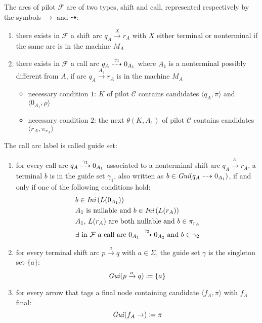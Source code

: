 \documentclass[english]{article}
\begin{document}
\bigskip
The arcs of pilot \(\mathcal{F}\) are of two types, shift and call, represented respectively by the symbols \(\rightarrow\) and \(\dashrightarrow\):

\begin{enumerate}
  \item there exists in \(\mathcal{F}\) a shift arc \(q_A \xrightarrow{X} r_A\) with \(X\) either terminal or nonterminal if the same arc is in the machine \(M_A\)
  \item there exists in \(\mathcal{F}\) a call arc \(q_A \stackrel{\gamma_1}{\dashrightarrow} 0_{A_1}\) where \(A_1\) is a nonterminal possibly different from \(A\), if arc \(q_A \xrightarrow{A_1} r_A\) is in the machine \(M_A\)
        \begin{itemize}[label=\(\rightarrow\)]
          \item necessary condition \(1\): \mstate \(K\) of pilot \(\mathcal{C}\) contains candidates \(\langle q_A, \pi \rangle\) and \(\langle 0_{A_1}, \rho\rangle\)
          \item necessary condition \(2\): the next \mstate \(\theta(K, A_1)\) of pilot \(\mathcal{C}\) contains candidates \(\langle r_A, \pi_{r_A} \rangle\)
        \end{itemize}
\end{enumerate}

\bigskip
The call arc label is called guide set:

\begin{enumerate}
  \item for every call arc \(q_A \stackrel{\gamma_1}{\dashrightarrow} 0_{A_1}\) associated to a nonterminal shift arc \(q_A \xrightarrow{A_1} r_A\), a terminal \(b\) is in the guide set \(\gamma_1\), also written as \(b \in \textit{Gui}\hspace{0.1ex}(q_A \dashrightarrow 0_{A_1})\), if and only if one of the following conditions hold:
        \begin{align}
           & b \in \Ini\left( L(0_{A_1}) \right) \label{eq:call-arc-condition-1}                                                                                              \\
           & A_1 \ \text{is nullable and} \ b \in \Ini\left( L(r_A) \right) \label{eq:call-arc-condition-2}                                                                   \\
           & A_1, \, L(r_A) \ \text{are both nullable and} \ b \in \pi_{r_A} \label{eq:call-arc-condition-3}                                                                  \\
           & \exists \ \text{in} \ \mathcal{F} \ \text{a call arc} \ 0_{A_1} \xdashrightarrow{\gamma_2} 0_{A_2} \ \text{and} \ b \in \gamma_2 \label{eq:call-arc-condition-4}
        \end{align}
  \item for every terminal shift arc \(p \xrightarrow{a} q\) with \(a \in \Sigma\), the guide set \(\gamma\) is the singleton set \(\{a\}\):
        \[ \textit{Gui}\hspace{0.1ex}(p \xrightarrow{a} q) \coloneqq \left\{ a \right\} \]
  \item for every arrow that tags a final node containing candidate \(\langle f_A, \pi \rangle\) with \(f_A\) final:
        \[ \textit{Gui}\hspace{0.1ex}(f_A \rightarrow ) \coloneqq \pi \]
\end{enumerate}
\end{document}
